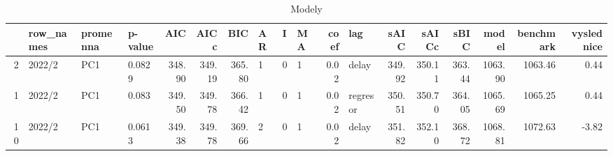 \begin{table}[ht]
\centering
\begin{tabular}{rlllrrrlllrlrrrrrr}
  \hline
 & row\_names & promenna & p-value & AIC & AICc & BIC & AR & I & MA & coef & lag & sAIC & sAICc & sBIC & model & benchmark & vyslednice \\ 
  \hline
2 & 2022/2 & PC1 & 0.0829 & 348.90 & 349.19 & 365.80 & 1 & 0 & 1 & 0.02 & delay & 349.92 & 350.11 & 363.44 & 1063.90 & 1063.46 & 0.44 \\ 
  1 & 2022/2 & PC1 & 0.083 & 349.50 & 349.78 & 366.42 & 1 & 0 & 1 & 0.02 & regresor & 350.51 & 350.70 & 364.05 & 1065.69 & 1065.25 & 0.44 \\ 
  10 & 2022/2 & PC1 & 0.0613 & 349.38 & 349.78 & 369.66 & 2 & 0 & 1 & 0.02 & delay & 351.82 & 352.10 & 368.72 & 1068.81 & 1072.63 & -3.82 \\ 
   \hline
\end{tabular}
\caption{Modely} 
\end{table}
